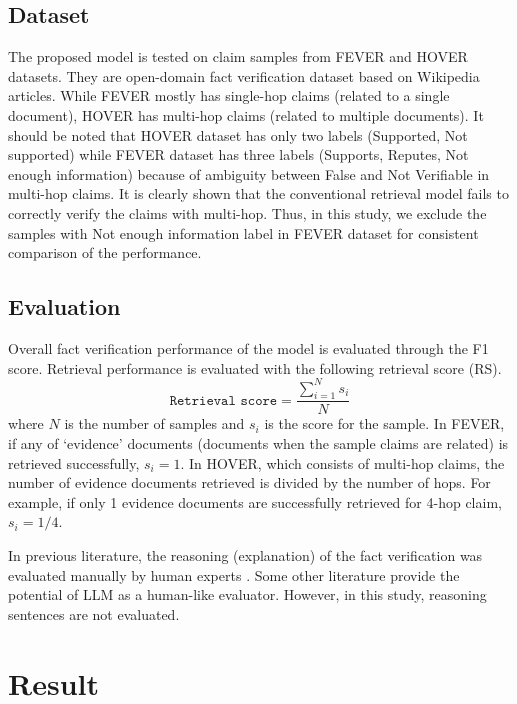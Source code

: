 \documentclass{article}
\begin{document}
\subsection{Dataset}
The proposed model is tested on claim samples from FEVER and HOVER datasets. They are open-domain fact verification dataset based on Wikipedia articles. While FEVER mostly has single-hop claims (related to a single document), HOVER has multi-hop claims (related to multiple documents). It should be noted that HOVER dataset has only two labels (Supported, Not supported) while FEVER dataset has three labels (Supports, Reputes, Not enough information) because of ambiguity between False and Not Verifiable in multi-hop claims. It is clearly shown that the conventional retrieval model fails to correctly verify the claims with multi-hop. Thus, in this study, we exclude the samples with Not enough information label in FEVER dataset for consistent comparison of the performance.

\subsection{Evaluation}
Overall fact verification performance of the model is evaluated through the F1 score. Retrieval performance is evaluated with the following retrieval score (RS).
$$\texttt{Retrieval score}=\frac{\sum_{i=1}^N s_i}{N}$$
where $N$ is the number of samples and $s_i$ is the score for the sample. In FEVER, if any of ‘evidence’ documents (documents when the sample claims are related) is retrieved successfully, $s_i=1$. In HOVER, which consists of multi-hop claims, the number of evidence documents retrieved is divided by the number of hops. For example, if only 1 evidence documents are successfully retrieved for 4-hop claim, $s_i=1/4$. \par
In previous literature, the reasoning (explanation) of the fact verification was evaluated manually by human experts \cite{zhang2023towards, wang2023explainable}. Some other literature \cite{kocmi2023large} provide the potential of LLM as a human-like evaluator. However, in this study, reasoning sentences are not evaluated.

\section{Result}
\end{document}
